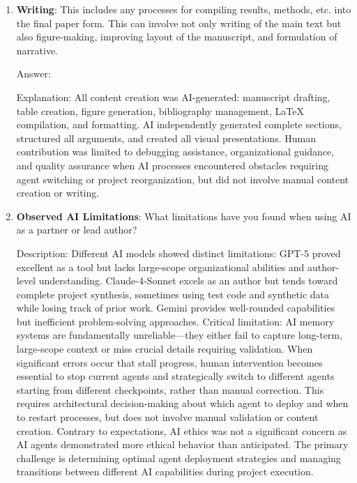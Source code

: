 \documentclass{article}
\begin{document}
\begin{enumerate}
    \item \textbf{Writing}: This includes any processes for compiling results, methods, etc. into the final paper form. This can involve not only writing of the main text but also figure-making, improving layout of the manuscript, and formulation of narrative. 

    Answer: \involvementB{} 
    
    Explanation: All content creation was AI-generated: manuscript drafting, table creation, figure generation, bibliography management, LaTeX compilation, and formatting. AI independently generated complete sections, structured all arguments, and created all visual presentations. Human contribution was limited to debugging assistance, organizational guidance, and quality assurance when AI processes encountered obstacles requiring agent switching or project reorganization, but did not involve manual content creation or writing.

    \item \textbf{Observed AI Limitations}: What limitations have you found when using AI as a partner or lead author? 

    Description: Different AI models showed distinct limitations: GPT-5 proved excellent as a tool but lacks large-scope organizational abilities and author-level understanding. Claude-4-Sonnet excels as an author but tends toward complete project synthesis, sometimes using test code and synthetic data while losing track of prior work. Gemini provides well-rounded capabilities but inefficient problem-solving approaches. Critical limitation: AI memory systems are fundamentally unreliable—they either fail to capture long-term, large-scope context or miss crucial details requiring validation. When significant errors occur that stall progress, human intervention becomes essential to stop current agents and strategically switch to different agents starting from different checkpoints, rather than manual correction. This requires architectural decision-making about which agent to deploy and when to restart processes, but does not involve manual validation or content creation. Contrary to expectations, AI ethics was not a significant concern as AI agents demonstrated more ethical behavior than anticipated. The primary challenge is determining optimal agent deployment strategies and managing transitions between different AI capabilities during project execution.
\end{enumerate}

\newpage
\end{document}
